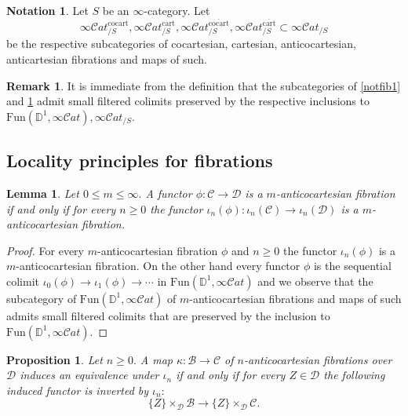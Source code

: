 \documentclass[10pt,oneside]{article}
\numberwithin{equation}{section} %
\numberwithin{figure}{section} %
\theoremstyle{plain}
\newtheorem{lemma}[theorem]{Lemma}
\newtheorem{proposition}[theorem]{Proposition}
\theoremstyle{definition}
\newtheorem{notation}[theorem]{Notation}
\newtheorem{remark}[theorem]{Remark}
\newcommand{\bD}{{\mathbb D}}
\newcommand{\mB}{{\mathcal B}}
\newcommand{\mC}{{\mathcal C}}
\newcommand{\mD}{{\mathcal D}}
\newcommand{\Fun}{\mathrm{Fun}}
\newcommand{\cocart}{{\mathrm{cocart}}}
\newcommand{\cart}{{\mathrm{cart}}}
\newcommand{\scat}{\mathcal{C}\mathit{at}}
\begin{document}
\begin{notation}\label{notfib2} Let $S$ be an $\infty$-category.
Let $$ \infty\scat^\cocart_{/S}, \infty\scat^\cart_{/S}, \infty\scat^{\overline{\cocart}}_{/S}, \infty\scat^{\overline{\cart}}_{/S} \subset \infty\scat_{/S} $$ be the respective subcategories of cocartesian, cartesian, anticocartesian, anticartesian fibrations and maps of such.

\end{notation}

\begin{remark}\label{seqcol}
It is immediate from the definition that the subcategories of
\cref{notfib1} and \cref{notfib2} admit small filtered colimits preserved by the respective inclusions to
$\Fun(\bD^1,\infty\scat), \infty\scat_{/S}.$
\end{remark}




\subsection{Locality principles for fibrations}



\begin{lemma}Let $0 \leq m \leq \infty.$
A functor $\phi: \mC \to \mD$ is a $m$-anticocartesian fibration 
if and only if for every $n \geq 0$ the functor
$\iota_n(\phi): \iota_n(\mC) \to \iota_n(\mD) $
is a $m$-anticocartesian fibration.
\end{lemma}

\begin{proof}
For every $m$-anticocartesian fibration $\phi$ and $n \geq 0$
the functor $\iota_n(\phi)$ is a $m$-anticocartesian fibration.
On the other hand every functor $\phi$ is the sequential colimit 
$ \iota_0(\phi) \to \iota_1(\phi) \to \cdots $ in $\Fun(\bD^1,\infty\scat)$
and we observe that the subcategory of $\Fun(\bD^1,\infty\scat) $ of $m$-anticocartesian fibrations and maps of such admits small filtered colimits that are preserved by the inclusion to $\Fun(\bD^1,\infty\scat) $.
\end{proof}

\begin{proposition}\label{fiberwiseeq}Let $ n  \geq 0.$
A map $\kappa: \mB \to \mC$ of $n$-anticocartesian fibrations over $\mD$ induces an equivalence under $\iota_n$ if and only if for every $Z \in \mD$ the following induced functor is inverted by $\iota_n:$
\begin{equation}\label{eqzt}
\{Z\} \times_\mD \mB \to  \{Z\} \times_\mD \mC. 
\end{equation}
   
\end{proposition}
\end{document}

